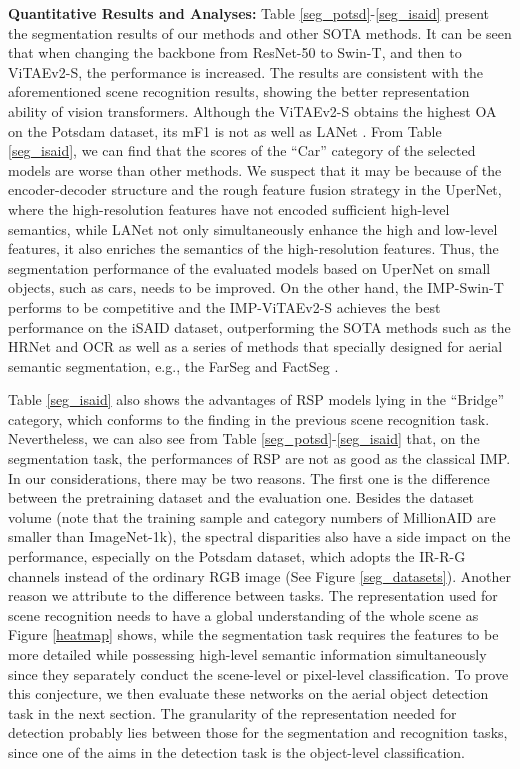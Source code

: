 \documentclass[10pt, journal,twoside]{IEEEtran}
\begin{document}
\textbf{Quantitative Results and Analyses:} Table \ref{seg_potsd}-\ref{seg_isaid} present the segmentation results of our methods and other SOTA methods. It can be seen that when changing the backbone from ResNet-50 to Swin-T, and then to ViTAEv2-S, the performance is increased. The results are consistent with the aforementioned scene recognition results, showing the better representation ability of vision transformers. Although the ViTAEv2-S obtains the highest OA on the Potsdam dataset, its mF1 is not as well as LANet \cite{ass_2021_tgrs_lanet}. From Table \ref{seg_isaid}, we can find that the scores of the ``Car'' category of the selected models are worse than other methods. We suspect that it may be because of the encoder-decoder structure and the rough feature fusion strategy in the UperNet, where the high-resolution features have not encoded sufficient high-level semantics, while LANet \cite{ass_2021_tgrs_lanet} not only simultaneously enhance the high and low-level features, it also enriches the semantics of the high-resolution features. Thus, the segmentation performance of the evaluated models based on UperNet on small objects, such as cars, needs to be improved. On the other hand, the IMP-Swin-T performs to be competitive and the IMP-ViTAEv2-S achieves the best performance on the iSAID dataset, outperforming the SOTA methods such as the HRNet \cite{hrnet} and OCR \cite{ocrnet} as well as a series of methods that specially designed for aerial semantic segmentation, e.g., the FarSeg \cite{farseg} and FactSeg \cite{ass_2022_tgrs_factseg}.

Table \ref{seg_isaid} also shows the advantages of RSP models lying in the ``Bridge'' category, which conforms to the finding in the previous scene recognition task. Nevertheless, we can also see from Table \ref{seg_potsd}-\ref{seg_isaid} that, on the segmentation task, the performances of RSP are not as good as the classical IMP. In our considerations, there may be two reasons. The first one is the difference between the pretraining dataset and the evaluation one. Besides the dataset volume (note that the training sample and category numbers of MillionAID are smaller than ImageNet-1k), the spectral disparities also have a side impact on the performance, especially on the Potsdam dataset, which adopts the IR-R-G channels instead of the ordinary RGB image (See Figure \ref{seg_datasets}). Another reason we attribute to the difference between tasks. The representation used for scene recognition needs to have a global understanding of the whole scene as Figure \ref{heatmap} shows, while the segmentation task requires the features to be more detailed while possessing high-level semantic information simultaneously since they separately conduct the scene-level or pixel-level classification. To prove this conjecture, we then evaluate these networks on the aerial object detection task in the next section. The granularity of the representation needed for detection probably lies between those for the segmentation and recognition tasks, since one of the aims in the detection task is the object-level classification.  
\end{document}

